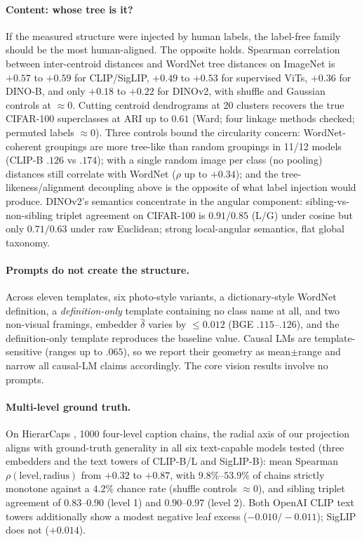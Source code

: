 \documentclass{article} %
\begin{document}
\paragraph{Content: whose tree is it?} If the measured structure were injected by human labels, the label-free family should be the most human-aligned. The opposite holds. Spearman correlation between inter-centroid distances and WordNet tree distances on ImageNet is $+0.57$ to $+0.59$ for CLIP/SigLIP, $+0.49$ to $+0.53$ for supervised ViTs, $+0.36$ for DINO-B, and only $+0.18$ to $+0.22$ for DINOv2, with shuffle and Gaussian controls at $\approx 0$. %
Cutting centroid dendrograms at 20 clusters recovers the true CIFAR-100 superclasses at ARI up to $0.61$ (Ward; four linkage methods checked; permuted labels $\approx 0$). %
Three controls bound the circularity concern: WordNet-coherent groupings are more tree-like than random groupings in 11/12 models (CLIP-B $.126$ vs $.174$); with a single random image per class (no pooling) distances still correlate with WordNet ($\rho$ up to $+0.34$); and the tree-likeness/alignment decoupling above is the opposite of what label injection would produce. %
DINOv2's semantics concentrate in the angular component: sibling-vs-non-sibling triplet agreement on CIFAR-100 is $0.91/0.85$ (L/G) under cosine but only $0.71/0.63$ under raw Euclidean; strong local-angular semantics, flat global taxonomy. %

\paragraph{Prompts do not create the structure.} Across eleven templates, six photo-style variants, a dictionary-style WordNet definition, a \emph{definition-only} template containing no class name at all, and two non-visual framings, embedder $\hat\delta$ varies by $\le 0.012$ (BGE $.115$--$.126$), and the definition-only template reproduces the baseline value. Causal LMs are template-sensitive (ranges up to $.065$), so we report their geometry as mean$\pm$range and narrow all causal-LM claims accordingly. The core vision results involve no prompts. %

\paragraph{Multi-level ground truth.} On HierarCaps \citep{alper2024hierarcaps}, 1000 four-level caption chains, the radial axis of our projection aligns with ground-truth generality in all six text-capable models tested (three embedders and the text towers of CLIP-B/L and SigLIP-B): mean Spearman $\rho(\mathrm{level}, \mathrm{radius})$ from $+0.32$ to $+0.87$, with $9.8\%$--$53.9\%$ of chains strictly monotone against a $4.2\%$ chance rate (shuffle controls $\approx 0$), and sibling triplet agreement of $0.83$--$0.90$ (level 1) and $0.90$--$0.97$ (level 2). Both OpenAI CLIP text towers additionally show a modest negative leaf excess ($-0.010/-0.011$); SigLIP does not ($+0.014$). %
\end{document}
